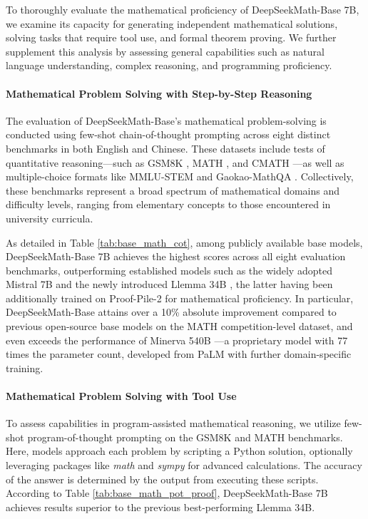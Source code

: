 To thoroughly evaluate the mathematical proficiency of DeepSeekMath-Base 7B, we examine its capacity for generating independent mathematical solutions, solving tasks that require tool use, and formal theorem proving. We further supplement this analysis by assessing general capabilities such as natural language understanding, complex reasoning, and programming proficiency.

\paragraph{Mathematical Problem Solving with Step-by-Step Reasoning}

The evaluation of DeepSeekMath-Base's mathematical problem-solving is conducted using few-shot chain-of-thought prompting \citep{cot} across eight distinct benchmarks in both English and Chinese. These datasets include tests of quantitative reasoning—such as GSM8K \citep{gsm8k}, MATH \citep{MATH}, and CMATH \citep{wei2023cmath}—as well as multiple-choice formats like MMLU-STEM \citep{mmlu} and Gaokao-MathQA \citep{agieval}. Collectively, these benchmarks represent a broad spectrum of mathematical domains and difficulty levels, ranging from elementary concepts to those encountered in university curricula.

As detailed in Table \ref{tab:base_math_cot}, among publicly available base models, DeepSeekMath-Base 7B achieves the highest scores across all eight evaluation benchmarks, outperforming established models such as the widely adopted Mistral 7B \citep{mistral} and the newly introduced Llemma 34B \citep{llemma}, the latter having been additionally trained on Proof-Pile-2 \citep{llemma} for mathematical proficiency. In particular, DeepSeekMath-Base attains over a 10\% absolute improvement compared to previous open-source base models on the MATH competition-level dataset, and even exceeds the performance of Minerva 540B \citep{minerva}—a proprietary model with 77 times the parameter count, developed from PaLM \citep{palm} with further domain-specific training.

\paragraph{Mathematical Problem Solving with Tool Use} To assess capabilities in program-assisted mathematical reasoning, we utilize few-shot program-of-thought prompting \citep{pot,pal} on the GSM8K and MATH benchmarks. Here, models approach each problem by scripting a Python solution, optionally leveraging packages like \textit{math} and \textit{sympy} for advanced calculations. The accuracy of the answer is determined by the output from executing these scripts. According to Table \ref{tab:base_math_pot_proof}, DeepSeekMath-Base 7B achieves results superior to the previous best-performing Llemma 34B.

